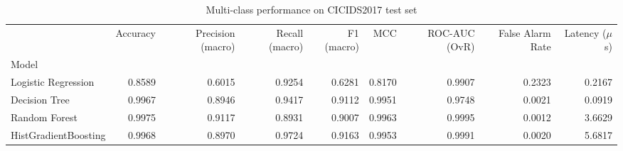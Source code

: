\begin{table}
\caption{Multi-class performance on CICIDS2017 test set}
\label{tab:results}
\begin{tabular}{lrrrrrrrr}
\toprule
 & Accuracy & Precision (macro) & Recall (macro) & F1 (macro) & MCC & ROC-AUC (OvR) & False Alarm Rate & Latency ($\mu$s) \\
Model &  &  &  &  &  &  &  &  \\
\midrule
Logistic Regression & 0.8589 & 0.6015 & 0.9254 & 0.6281 & 0.8170 & 0.9907 & 0.2323 & 0.2167 \\
Decision Tree & 0.9967 & 0.8946 & 0.9417 & 0.9112 & 0.9951 & 0.9748 & 0.0021 & 0.0919 \\
Random Forest & 0.9975 & 0.9117 & 0.8931 & 0.9007 & 0.9963 & 0.9995 & 0.0012 & 3.6629 \\
HistGradientBoosting & 0.9968 & 0.8970 & 0.9724 & 0.9163 & 0.9953 & 0.9991 & 0.0020 & 5.6817 \\
\bottomrule
\end{tabular}
\end{table}
